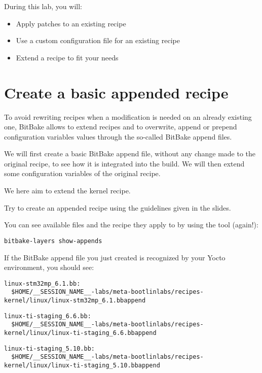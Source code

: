 
During this lab, you will:
\begin{itemize}
  \item Apply patches to an existing recipe
  \item Use a custom configuration file for an existing recipe
  \item Extend a recipe to fit your needs
\end{itemize}

\section{Create a basic appended recipe}

To avoid rewriting recipes when a modification is needed on an already existing
one, BitBake allows to extend recipes and to overwrite, append or prepend
configuration variables values through the so-called BitBake append files.

We will first create a basic BitBake append file, without any change made
to the original recipe, to see how it is integrated into the build. We will then
extend some configuration variables of the original recipe.

We here aim to extend the 
{{}} kernel recipe.

Try to create an appended recipe using the guidelines given in the slides.

You can see available  files and the recipe they apply to by
using the  tool (again!):
\begin{verbatim}
bitbake-layers show-appends
\end{verbatim}

If the BitBake append file you just created is recognized by your Yocto
environment, you should see:
\if{}
\begin{verbatim}
linux-stm32mp_6.1.bb:
  $HOME/__SESSION_NAME__-labs/meta-bootlinlabs/recipes-kernel/linux/linux-stm32mp_6.1.bbappend
\end{verbatim}
\else
  \if{}
\begin{verbatim}
linux-ti-staging_6.6.bb:
  $HOME/__SESSION_NAME__-labs/meta-bootlinlabs/recipes-kernel/linux/linux-ti-staging_6.6.bbappend
\end{verbatim}
  \else
\begin{verbatim}
linux-ti-staging_5.10.bb:
  $HOME/__SESSION_NAME__-labs/meta-bootlinlabs/recipes-kernel/linux/linux-ti-staging_5.10.bbappend
\end{verbatim}
  \fi
\fi

